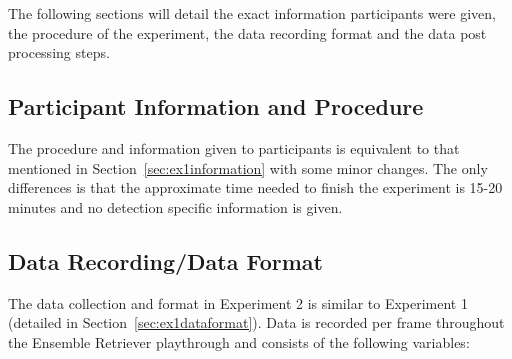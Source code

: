 The following sections will detail the exact information participants were given, the procedure of the experiment, the data recording format and the data post processing steps.

\subsection{Participant Information and Procedure}\label{sec:ex2information}
The procedure and information given to participants is equivalent to that mentioned in Section~\ref{sec:ex1information} with some minor changes. The only differences is that the approximate time needed to finish the experiment is 15-20 minutes and no detection specific information is given. 

\subsection{Data Recording/Data Format}\label{sec:ex2dataformat}
The data collection and format in Experiment 2 is similar to Experiment 1 (detailed in Section~\ref{sec:ex1dataformat}). Data is recorded per frame throughout the Ensemble Retriever playthrough and consists of the following variables:

